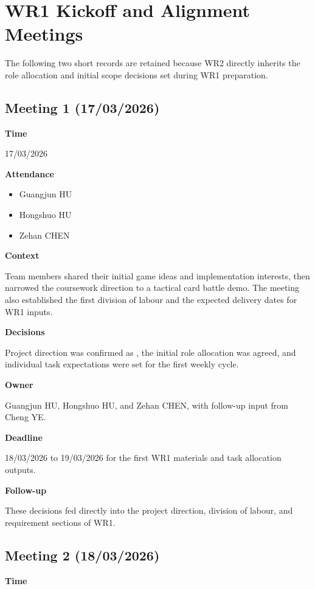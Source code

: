 \section{WR1 Kickoff and Alignment Meetings}

The following two short records are retained because WR2 directly inherits the role allocation and initial scope decisions set during WR1 preparation.

\subsection{Meeting 1 (17/03/2026)}

\textbf{Time}

17/03/2026

\textbf{Attendance}

\begin{itemize}
\item Guangjun HU
\item Hongshuo HU
\item Zehan CHEN
\end{itemize}

\textbf{Context}

Team members shared their initial game ideas and implementation interests, then narrowed the coursework direction to a tactical card battle demo. The meeting also established the first division of labour and the expected delivery dates for WR1 inputs.

\textbf{Decisions}

Project direction was confirmed as \projectname{}, the initial role allocation was agreed, and individual task expectations were set for the first weekly cycle.

\textbf{Owner}

Guangjun HU, Hongshuo HU, and Zehan CHEN, with follow-up input from Cheng YE.

\textbf{Deadline}

18/03/2026 to 19/03/2026 for the first WR1 materials and task allocation outputs.

\textbf{Follow-up}

These decisions fed directly into the project direction, division of labour, and requirement sections of WR1.

\subsection{Meeting 2 (18/03/2026)}

\textbf{Time}

